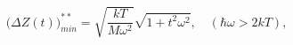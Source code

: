\documentclass{article}
\begin{document}
\begin{equation}
    \big( \Delta Z (t) \big)^{**}_{min} = \sqrt{\frac{ kT}{ M \omega^{2}} } \sqrt{1+t^{2}\omega^{2}}, \quad (\hbar \omega > 2kT) ,
\end{equation}

\end{document}
